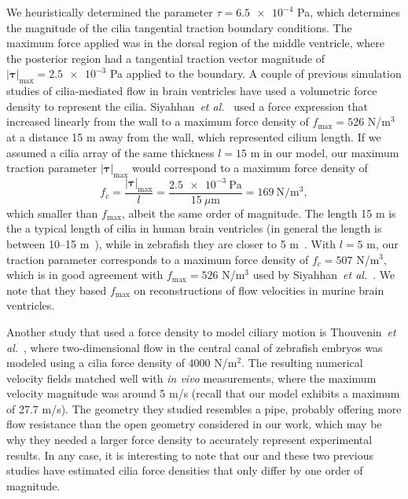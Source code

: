 \documentclass[fleqn]{wlscirep}
\newcommand{\btau}{\bm{\tau}}
\begin{document}
We heuristically determined the parameter $\tau = \num{6.5e-4}$ Pa, which determines
the magnitude of the cilia tangential traction boundary conditions. The maximum force applied
was in the dorsal region of the middle ventricle, where the posterior region had a tangential
traction vector magnitude of $\vert\btau\vert_{\mathrm{max}} = \num{2.5e-3}$ Pa applied to the
boundary. A couple of previous simulation studies of cilia-mediated flow in brain ventricles have
used a volumetric force density to represent the cilia. Siyahhan~\emph{et al.}~\cite{Siyahhan2014FlowVentricles}
used a force expression that increased linearly from the wall to a maximum force density of
$f_{\mathrm{max}} = 526$ N/$\mathrm{m^3}$ at a distance 15 \textmu m away from the wall,
which represented cilium length. If we assumed a cilia array of the same thickness
$l = 15$ \textmu m in our model, our maximum traction parameter $\vert\btau\vert_{\mathrm{max}}$
would correspond to a maximum force density of 
\begin{equation*}
    f_c = \frac{\vert\btau\vert_{\mathrm{max}}}{l}
        = \frac{\num{2.5e-3} \ \mathrm{Pa}}{15 \ \mu\mathrm{m}}
        = 169 \ \mathrm{N/m^3},
\end{equation*}
which smaller than $f_{\mathrm{max}}$, albeit the same order of magnitude.
The length 15 \textmu m is the a typical length of cilia in human brain ventricles
(in general the length is between 10--15 \textmu m~\cite{Afzelius2004Cilia-relatedDiseases}),
while in zebrafish they are closer to 5 \textmu m~\cite{Salman2022ComputationalEmbryo}.
With $l=5$ \textmu m, our traction parameter corresponds to a maximum force density of
$f_c=507$ N/$\mathrm{m^3}$, which is in good agreement with $f_{\mathrm{max}} = 526$ N/$\mathrm{m^3}$
used by Siyahhan~\emph{et al.}~\cite{Siyahhan2014FlowVentricles}.
We note that they based $f_{\mathrm{max}}$ on reconstructions of flow velocities in murine brain ventricles.

Another study that used a force density to model ciliary motion is
Thouvenin~\emph{et al.}~\cite{Thouvenin2020OriginCanal}, where two-dimensional flow
in the central canal of zebrafish embryos was modeled using a cilia force density of
4000 N/$\mathrm{m^2}$. The resulting numerical velocity fields matched well with
\emph{in vivo} measurements, where the maximum velocity magnitude was around 5 \textmu m/s
(recall that our model exhibits a maximum of 27.7 \textmu m/s).
The geometry they studied resembles a pipe, probably offering more flow resistance
than the open geometry considered in our work, which may be why they needed a larger
force density to accurately represent experimental results. In any case, it is
interesting to note that our and these two previous studies have estimated
cilia force densities that only differ by one order of magnitude.
\end{document}

